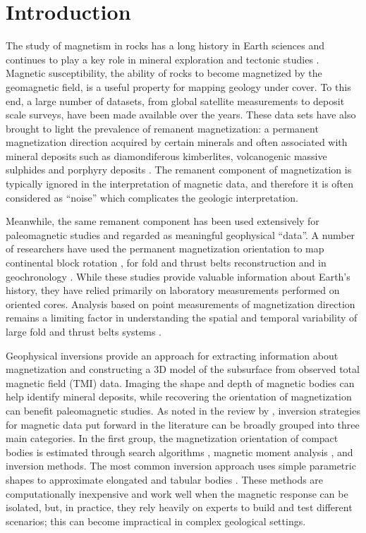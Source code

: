 \documentclass[paper]{geophysics}
\begin{document}
\section{Introduction}
The study of magnetism in rocks has a long history in Earth sciences and continues to play a key role in mineral exploration and tectonic studies \cite[]{NATOASIS1989, Pueyo2016, Li2019}. Magnetic susceptibility, the ability of rocks to become magnetized by the geomagnetic field, is a useful property for mapping geology under cover. To this end, a large number of datasets, from global satellite measurements to deposit scale surveys, have been made available over the years. These  data sets  have also brought to light the prevalence of remanent magnetization: a permanent magnetization direction acquired by certain minerals and often associated with mineral deposits such as diamondiferous kimberlites, volcanogenic massive sulphides and porphyry deposits \cite[]{Henkel1991, Enkin2014}. The remanent component of magnetization is typically ignored in the interpretation of magnetic data, and therefore it is often considered as ``noise'' which complicates the geologic interpretation.

Meanwhile, the same remanent component has been used extensively for paleomagnetic studies and regarded as meaningful geophysical “data”. A number of researchers have used the permanent magnetization orientation to map continental block rotation \cite[]{Norris1961, Vine1963, NATOASIS1989}, for fold and thrust belts reconstruction \cite[]{Ramon2012, Villalain2015} and in geochronology \cite[]{Henkel1991, Lockhart2004, Enkin2003}.
While these studies provide valuable information about Earth's history, they have relied primarily on laboratory measurements performed on oriented cores. Analysis based on point measurements of magnetization direction remains a limiting factor in understanding the spatial and temporal variability of large fold and thrust belts systems \cite[]{Pueyo2016}.

Geophysical inversions provide an approach for extracting information about magnetization and constructing a 3D model of the subsurface from observed total magnetic field (TMI) data.
Imaging the shape and depth of magnetic bodies can help identify mineral deposits, while recovering the orientation of magnetization can benefit paleomagnetic studies.
As noted in the review by \cite{Li2017}, inversion strategies for magnetic data put forward in the literature can be broadly grouped into three main categories. In the first group, the magnetization orientation of compact bodies is estimated through search algorithms \cite[]{Fedi1994, DannemillerLi06}, magnetic moment analysis \cite[]{Helbig1963, Phillips03}, and inversion methods. The most common inversion approach uses simple parametric shapes to approximate elongated and tabular bodies \cite[]{Foss2011a, Fullagar2013, Clark2014, Pratt2014}. These methods are computationally inexpensive and work well when the magnetic response can be isolated, but, in practice, they rely heavily on experts to build and test different scenarios; this can become impractical in complex geological settings.
\end{document}
